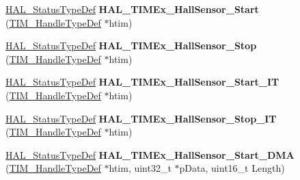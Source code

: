 \begin{DoxyCompactItemize}
\item 
\hyperlink{stm32f4xx__hal__def_8h_a63c0679d1cb8b8c684fbb0632743478f}{H\+A\+L\+\_\+\+Status\+Type\+Def} {\bfseries H\+A\+L\+\_\+\+T\+I\+M\+Ex\+\_\+\+Hall\+Sensor\+\_\+\+Start} (\hyperlink{struct_t_i_m___handle_type_def}{T\+I\+M\+\_\+\+Handle\+Type\+Def} $\ast$htim)\hypertarget{group___t_i_m_ex___exported___functions___group1_ga9f4bfa2a4b890a2219ca927bbbb455fc}{}\label{group___t_i_m_ex___exported___functions___group1_ga9f4bfa2a4b890a2219ca927bbbb455fc}

\item 
\hyperlink{stm32f4xx__hal__def_8h_a63c0679d1cb8b8c684fbb0632743478f}{H\+A\+L\+\_\+\+Status\+Type\+Def} {\bfseries H\+A\+L\+\_\+\+T\+I\+M\+Ex\+\_\+\+Hall\+Sensor\+\_\+\+Stop} (\hyperlink{struct_t_i_m___handle_type_def}{T\+I\+M\+\_\+\+Handle\+Type\+Def} $\ast$htim)\hypertarget{group___t_i_m_ex___exported___functions___group1_ga714c2a7a51f4ab61b04df84ab182eb86}{}\label{group___t_i_m_ex___exported___functions___group1_ga714c2a7a51f4ab61b04df84ab182eb86}

\item 
\hyperlink{stm32f4xx__hal__def_8h_a63c0679d1cb8b8c684fbb0632743478f}{H\+A\+L\+\_\+\+Status\+Type\+Def} {\bfseries H\+A\+L\+\_\+\+T\+I\+M\+Ex\+\_\+\+Hall\+Sensor\+\_\+\+Start\+\_\+\+IT} (\hyperlink{struct_t_i_m___handle_type_def}{T\+I\+M\+\_\+\+Handle\+Type\+Def} $\ast$htim)\hypertarget{group___t_i_m_ex___exported___functions___group1_gaf3e7068c5bc6fc74e016cc8e990cbb02}{}\label{group___t_i_m_ex___exported___functions___group1_gaf3e7068c5bc6fc74e016cc8e990cbb02}

\item 
\hyperlink{stm32f4xx__hal__def_8h_a63c0679d1cb8b8c684fbb0632743478f}{H\+A\+L\+\_\+\+Status\+Type\+Def} {\bfseries H\+A\+L\+\_\+\+T\+I\+M\+Ex\+\_\+\+Hall\+Sensor\+\_\+\+Stop\+\_\+\+IT} (\hyperlink{struct_t_i_m___handle_type_def}{T\+I\+M\+\_\+\+Handle\+Type\+Def} $\ast$htim)\hypertarget{group___t_i_m_ex___exported___functions___group1_gac6ab7ab0cada425a8d4deb637bd2ad71}{}\label{group___t_i_m_ex___exported___functions___group1_gac6ab7ab0cada425a8d4deb637bd2ad71}

\item 
\hyperlink{stm32f4xx__hal__def_8h_a63c0679d1cb8b8c684fbb0632743478f}{H\+A\+L\+\_\+\+Status\+Type\+Def} {\bfseries H\+A\+L\+\_\+\+T\+I\+M\+Ex\+\_\+\+Hall\+Sensor\+\_\+\+Start\+\_\+\+D\+MA} (\hyperlink{struct_t_i_m___handle_type_def}{T\+I\+M\+\_\+\+Handle\+Type\+Def} $\ast$htim, uint32\+\_\+t $\ast$p\+Data, uint16\+\_\+t Length)\hypertarget{group___t_i_m_ex___exported___functions___group1_ga3d0d063498f6888d61411d56380f5211}{}\label{group___t_i_m_ex___exported___functions___group1_ga3d0d063498f6888d61411d56380f5211}


\end{DoxyCompactItemize}
